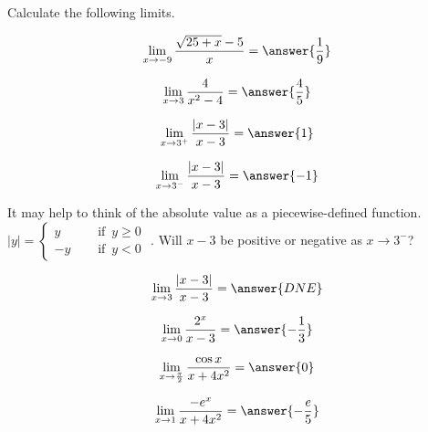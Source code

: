\documentclass{ximera}
\author{Nela Lakos \and Kyle Parsons \and Bobby Ramsey}
\begin{document}
Calculate the following limits.

\begin{exercise}
	\[\lim_{x\to-9}\frac{\sqrt{25+x} -5}{x} = \answer{\frac{1}{9}}\]
\end{exercise}

\begin{exercise}
	\[\lim_{x\to3}\frac{4}{x^2-4} = \answer{\frac{4}{5}}\]
\end{exercise}

\begin{exercise}
	\[\lim_{x\to3^+}\frac{\left|x-3\right|}{x-3} = \answer{1}\]
	\begin{exercise}
		\[ \lim_{x\to3^-}\frac{\left|x-3\right|}{x-3} = \answer{-1}\]
		\begin{feedback}
			It may help to think of the absolute value as a piecewise-defined function.\\
			$\displaystyle |y| = \begin{cases} y & \quad \text{ if } \, y \geq 0 \\ -y & \quad \text{ if  } \, y < 0 \end{cases}$ .  Will $x-3$ be positive or negative as $x \to 3^-$?
		\end{feedback}
		\begin{exercise}
			\[\lim_{x\to3}\frac{\left|x-3\right|}{x-3} = \answer{DNE}\]

		\end{exercise}
	\end{exercise}
\end{exercise}

\begin{exercise}
	\[\lim_{x\to0}\frac{2^x}{x-3} = \answer{-\frac{1}{3}}\]
\end{exercise}

\begin{exercise}
	\[\lim_{x\to\frac{\pi}{2}} \frac{\cos x}{x+4x^2} = \answer{{0}}\]
\end{exercise}

\begin{exercise}
	\[\lim_{x\to1}\frac{-e^x}{x+4x^2} = \answer{-\frac{e}{5}} \]
\end{exercise}
\end{document}
